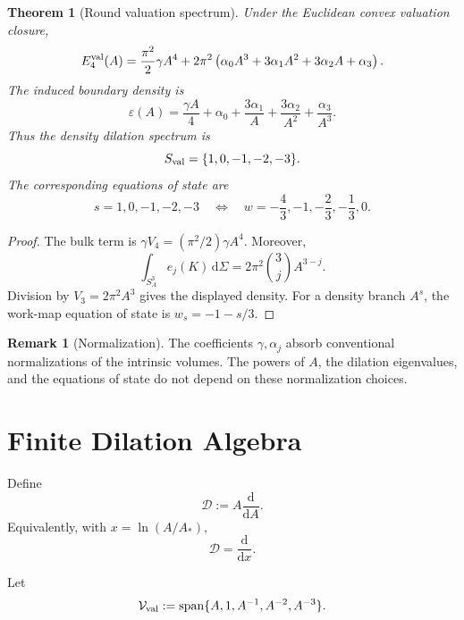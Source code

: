 \documentclass[aps,prd,reprint,onecolumn,nofootinbib,superscriptaddress,showkeys]{revtex4-2}
\numberwithin{equation}{section}
\theoremstyle{definition}
\newtheorem{remark}{Remark}[section]
\theoremstyle{plain}
\newtheorem{theorem}{Theorem}[section]
\newcommand{\Sthree}{S^3}
\newcommand{\dd}{\mathrm d}
\newcommand{\Dil}{\mathscr D}
\newcommand{\spanop}{\operatorname{span}}
\begin{document}
\begin{theorem}[Round valuation spectrum]
Under the Euclidean convex valuation closure,
\begin{equation}
E_4^{\rm val}(A)
=
\frac{\pi^2}{2}\gamma A^4
+
2\pi^2
\left(
\alpha_0A^3+3\alpha_1A^2+3\alpha_2A+\alpha_3
\right).
\end{equation}
The induced boundary density is
\begin{equation}
\varepsilon(A)
=
\frac{\gamma A}{4}
+\alpha_0
+\frac{3\alpha_1}{A}
+\frac{3\alpha_2}{A^2}
+\frac{\alpha_3}{A^3}.
\end{equation}
Thus the density dilation spectrum is
\begin{equation}
S_{\rm val}=\{1,0,-1,-2,-3\}.
\end{equation}
The corresponding equations of state are
\begin{equation}
s=1,0,-1,-2,-3
\quad\Longleftrightarrow\quad
w=-\frac43,-1,-\frac23,-\frac13,0.
\end{equation}
\end{theorem}

\begin{proof}
The bulk term is \(\gamma V_4=(\pi^2/2)\gamma A^4\).  Moreover,
\[
\int_{\Sthree_A}e_j(K)\,\dd\Sigma
=
2\pi^2\binom3j A^{3-j}.
\]
Division by \(V_3=2\pi^2A^3\) gives the displayed density.  For a density branch \(A^s\), the work-map equation of state is \(w_s=-1-s/3\).
\end{proof}

\begin{remark}[Normalization]
The coefficients \(\gamma,\alpha_j\) absorb conventional normalizations of the intrinsic volumes.  The powers of \(A\), the dilation eigenvalues, and the equations of state do not depend on these normalization choices.
\end{remark}

\section{Finite Dilation Algebra}

Define
\begin{equation}
\Dil:=A\frac{\dd}{\dd A}.
\end{equation}
Equivalently, with \(x=\ln(A/A_*)\),
\begin{equation}
\Dil=\frac{\dd}{\dd x}.
\end{equation}

Let
\begin{equation}
\mathcal V_{\rm val}
:=
\spanop\{A,1,A^{-1},A^{-2},A^{-3}\}.
\end{equation}
\end{document}
